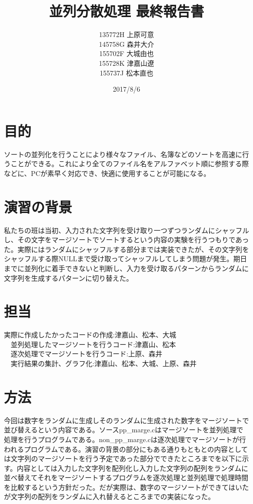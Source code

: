 \documentclass[11pt,a4paper]{jsarticle}
\begin{document}
\title{並列分散処理 最終報告書}
\author{135772H 上原可意\\145758G 森井大介\\155702F 大城由也\\155728K 津嘉山遼\\155737J 松本直也\\}
\date{2017/8/6}

\maketitle
\newpage
\section*{目的}
ソートの並列化を行うことにより様々なファイル、名簿などのソートを高速に行うことができる。これにより全てのファイル名をアルファベット順に参照する際などに、PCが素早く対応でき、快適に使用することが可能になる。

\section*{演習の背景}
私たちの班は当初、入力された文字列を受け取り一つずつランダムにシャッフルし、その文字をマージソートでソートするという内容の実験を行うつもりであった。実際にはランダムにシャッフルする部分までは実装できたが、その文字列をシャッフルする際NULLまで受け取ってシャッフルしてしまう問題が発生。期日までに並列化に着手できないと判断し、入力を受け取るパターンからランダムに文字列を生成するパターンに切り替えた。

\section*{担当}
実際に作成したかったコードの作成:津嘉山、松本、大城\\
　並列処理したマージソートを行うコード:津嘉山、松本\\
　逐次処理でマージソートを行うコード:上原、森井\\
　実行結果の集計、グラフ化:津嘉山、松本、大城、上原、森井


\section*{方法}
今回は数字をランダムに生成しそのランダムに生成された数字をマージソートで並び替えるという内容である。ソースpp\_marge.cはマージソートを並列処理で処理を行うプログラムである。non\_pp\_marge.cは逐次処理でマージソートが行われるプログラムである。演習の背景の部分にもある通りもともとの内容としては文字列のマージソートを行う予定であった部分でできたところまでを以下に示す。内容としては入力した文字列を配列化し入力した文字列の配列をランダムに並べ替えてそれをマージソートするプログラムを逐次処理と並列処理で処理時間を比較するという方針だった。だが実際は、数字のマージソートができてはいたが文字列の配列をランダムに入れ替えるところまでの実装になった。
\end{document}
